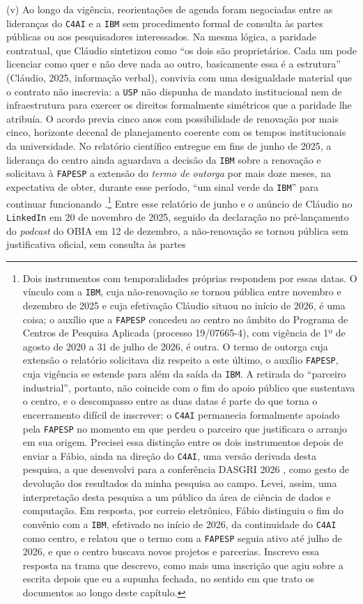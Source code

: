 (v) Ao longo da vigência, reorientações de agenda foram negociadas entre as lideranças do \texttt{C4AI} e a \texttt{IBM} sem procedimento formal de consulta às partes públicas ou aos pesquisadores interessados. Na mesma lógica, a paridade contratual, que Cláudio sintetizou como \enquote{os dois são proprietários. Cada um pode licenciar como quer e não deve nada ao outro, basicamente essa é a estrutura} (Cláudio, 2025, informação verbal), convivia com uma desigualdade material que o contrato não inscrevia: a \texttt{USP} não dispunha de mandato institucional nem de infraestrutura para exercer os direitos formalmente simétricos que a paridade lhe atribuía. O acordo previa cinco anos com possibilidade de renovação por mais cinco, horizonte decenal de planejamento coerente com os tempos institucionais da universidade. No relatório científico entregue em fins de junho de 2025, a liderança do centro ainda aguardava a decisão da \texttt{IBM} sobre a renovação e solicitava à \texttt{FAPESP} a extensão do \textit{termo de outorga} por mais doze meses, na expectativa de obter, durante esse período, \enquote{um sinal verde da \texttt{IBM}} para continuar funcionando \parencite[p.~5]{C4AI2025}.\footnote{Dois instrumentos com temporalidades próprias respondem por essas datas. O vínculo com a \texttt{IBM}, cuja não-renovação se tornou pública entre novembro e dezembro de 2025 e cuja efetivação Cláudio situou no início de 2026, é uma coisa; o auxílio que a \texttt{FAPESP} concedeu ao centro no âmbito do Programa de Centros de Pesquisa Aplicada (processo 19/07665-4), com vigência de 1º de agosto de 2020 a 31 de julho de 2026, é outra. O termo de outorga cuja extensão o relatório solicitava diz respeito a este último, o auxílio \texttt{FAPESP}, cuja vigência se estende para além da saída da \texttt{IBM}. A retirada do \enquote{parceiro industrial}, portanto, não coincide com o fim do apoio público que sustentava o centro, e o descompasso entre as duas datas é parte do que torna o encerramento difícil de inscrever: o \texttt{C4AI} permanecia formalmente apoiado pela \texttt{FAPESP} no momento em que perdeu o parceiro que justificara o arranjo em sua origem. Precisei essa distinção entre os dois instrumentos depois de enviar a Fábio, ainda na direção do \texttt{C4AI}, uma versão derivada desta pesquisa, a que desenvolvi para a conferência DASGRI 2026 \parencite{Helanski2026DASGRI}, como gesto de devolução dos resultados da minha pesquisa ao campo. Levei, assim, uma interpretação desta pesquisa a um público da área de ciência de dados e computação. Em resposta, por correio eletrônico, Fábio distinguiu o fim do convênio com a \texttt{IBM}, efetivado no início de 2026, da continuidade do \texttt{C4AI} como centro, e relatou que o termo com a \texttt{FAPESP} seguia ativo até julho de 2026, e que o centro buscava novos projetos e parcerias. Inscrevo essa resposta na trama que descrevo, como mais uma inscrição que agiu sobre a escrita depois que eu a supunha fechada, no sentido em que trato os documentos ao longo deste capítulo.} Entre esse relatório de junho e o anúncio de Cláudio no \texttt{LinkedIn} em 20 de novembro de 2025, seguido da declaração no pré-lançamento do \emph{podcast} do OBIA em 12 de dezembro, a não-renovação se tornou pública sem justificativa oficial, sem consulta às partes 